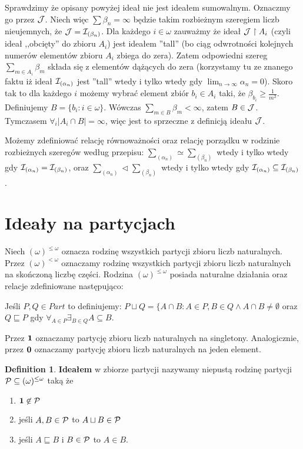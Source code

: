 \documentclass[12pt]{article}
\theoremstyle{plain}
\theoremstyle{definition}
\newtheorem{definition}[theorem]{Definition}
\theoremstyle{remark}
\newcommand{\cI}{{\cal I}}
\newcommand{\cJ}{{\cal J}}
\newcommand{\cP}{{\cal P}}
\newcommand{\Part}{(\omega)^{\leq\omega}}
\newcommand{\FinPart}{(\omega)^{<\omega}}
\begin{document}
Sprawdzimy że opisany powyżej ideał nie jest ideałem 
sumowalnym. Oznaczmy go przez $\cJ$. Niech więc
$\sum \beta_n = \infty$ będzie takim rozbieżnym szeregiem
liczb nieujemnych, że $\cJ = \cI_{(\beta_n)}$.
Dla każdego $i \in \omega$ zauważmy że ideał 
$\cJ \restriction A_i$ (czyli ideał ,,obcięty'' do zbioru $A_i$)
jest ideałem ''tall'' (bo ciąg odwrotności kolejnych numerów
elementów zbioru $A_i$ zbiega do zera). 
Zatem odpowiedni szereg $\sum_{m\in A_i} \beta_m $
składa się z elementów dążących do zera 
(korzystamy tu ze znanego faktu iż ideał
$\cI_{(\alpha_n)}$ jest ''tall'' wtedy i tylko wtedy
gdy $\lim_{n\to\infty} \alpha_n = 0$).
Skoro tak to dla każdego $i$ możemy wybrać element
zbiór $b_i \in A_i$ taki, że 
$\beta_{b_i} \geq \frac{1}{m^2}$.
Definiujemy $B = \lbrace {b_i\colon i\in\omega} \rbrace$. Wówczas
$\sum_{m\in B} \beta_m < \infty$, zatem $B \in \cJ$.
Tymczasem $\forall_{i} |A_i \cap B| = \infty$,
więc jest to sprzeczne z definicją ideału $\cJ$.


Możemy zdefiniować relację równoważności oraz relację porządku w rodzinie
rozbieżnych szeregów według przepisu:
$\sum_{(\alpha_n)} \simeq \sum_{(\beta_n)}$ wtedy i tylko wtedy gdy
$\cI_{(\alpha_n)} = \cI_{(\beta_n)}$, oraz
$\sum_{(\alpha_n)} \lhd \sum_{(\beta_n)}$ wtedy i tylko wtedy gdy
$\cI_{(\alpha_n)} \subseteq \cI_{(\beta_n)}$.


\section{Ideały na partycjach}

Niech $\Part$ oznacza rodzinę wszystkich partycji zbioru liczb naturalnych.
Przez $\FinPart$ oznaczamy rodzinę wszystkich partycji
zbioru liczb naturalnych na skończoną liczbę części.
Rodzina $\Part$ posiada naturalne działania oraz relacje
zdefiniowane następująco:

Jeśli $P,Q \in Part$ to definiujemy:
$P\sqcup Q = \{A \cap B \colon A \in P, B\in Q \wedge 
A \cap B \not= \emptyset$
oraz $Q \sqsubseteq P$ gdy $\forall_{A\in P} \exists_{B\in Q} A\subseteq B$.

Przez ${\bf 1}$ oznaczamy partycję zbioru liczb naturalnych 
na singletony. Analogicznie, przez ${\bf 0}$ oznaczamy
partycję zbioru liczb naturalnych na jeden element.

\begin{definition}
{\bf Ideałem} w zbiorze partycji nazywamy niepustą rodzinę
partycji $\cP \subseteq \Part$ taką że
\begin{enumerate}
\item ${\bf 1} \not\in\cP$
\item jeśli $A,B\in \cP$ to $A\sqcup B\in \cP$
\item jeśli $A \sqsubseteq B$ i $B\in \cP$ to $A\in B$.
\end{enumerate}
\end{definition}
\end{document}
